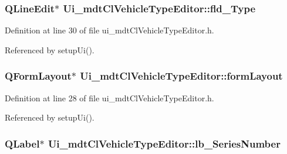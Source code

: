 \hypertarget{class_ui__mdt_cl_vehicle_type_editor_a697e3175e1d3d3a7b221222fe4641b5a}{
\subsubsection[{fld\-\_\-\-Type}]{\setlength{\rightskip}{0pt plus 5cm}Q\-Line\-Edit$\ast$ Ui\-\_\-mdt\-Cl\-Vehicle\-Type\-Editor\-::fld\-\_\-\-Type}}\label{class_ui__mdt_cl_vehicle_type_editor_a697e3175e1d3d3a7b221222fe4641b5a}


Definition at line 30 of file ui\-\_\-mdt\-Cl\-Vehicle\-Type\-Editor.\-h.



Referenced by setup\-Ui().

\hypertarget{class_ui__mdt_cl_vehicle_type_editor_a40784adcad4d2daddb0cbbc49bfde0b7}{
\subsubsection[{form\-Layout}]{\setlength{\rightskip}{0pt plus 5cm}Q\-Form\-Layout$\ast$ Ui\-\_\-mdt\-Cl\-Vehicle\-Type\-Editor\-::form\-Layout}}\label{class_ui__mdt_cl_vehicle_type_editor_a40784adcad4d2daddb0cbbc49bfde0b7}


Definition at line 28 of file ui\-\_\-mdt\-Cl\-Vehicle\-Type\-Editor.\-h.



Referenced by setup\-Ui().

\hypertarget{class_ui__mdt_cl_vehicle_type_editor_abb19b012a4c9a91f03c4528a0902d790}{
\subsubsection[{lb\-\_\-\-Series\-Number}]{\setlength{\rightskip}{0pt plus 5cm}Q\-Label$\ast$ Ui\-\_\-mdt\-Cl\-Vehicle\-Type\-Editor\-::lb\-\_\-\-Series\-Number}}\label{class_ui__mdt_cl_vehicle_type_editor_abb19b012a4c9a91f03c4528a0902d790}


